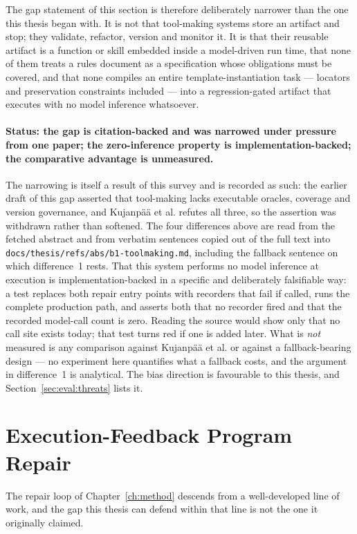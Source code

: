 The gap statement of this section is therefore deliberately narrower than the one this thesis
began with. It is not that tool-making systems store an artifact and stop; they validate,
refactor, version and monitor it. It is that their reusable artifact is a function or skill
embedded inside a model-driven run time, that none of them treats a rules document as a
specification whose obligations must be covered, and that none compiles an entire
template-instantiation task --- locators and preservation constraints included --- into a
regression-gated artifact that executes with no model inference whatsoever.

\paragraph{Status: the gap is citation-backed and was narrowed under pressure from one paper;
the zero-inference property is implementation-backed; the comparative advantage is unmeasured.}
The narrowing is itself a result of this survey and is recorded as such: the earlier draft of
this gap asserted that tool-making lacks executable oracles, coverage and version governance,
and Kujanpää et al. refutes all three, so the assertion was withdrawn rather than softened.
The four differences above are read from the fetched abstract and from verbatim sentences copied
out of the full text into \texttt{docs/thesis/refs/abs/b1-toolmaking.md}, including the fallback
sentence on which difference~1 rests. That this system performs no model inference at execution
is implementation-backed in a specific and deliberately falsifiable way: a test replaces both
repair entry points with recorders that fail if called, runs the complete production path, and
asserts both that no recorder fired and that the recorded model-call count is zero. Reading the
source would show only that no call site exists today; that test turns red if one is added
later. What is \emph{not} measured is any comparison against Kujanpää et al. or against a
fallback-bearing design --- no experiment here quantifies what a fallback costs, and the
argument in difference~1 is analytical. The bias direction is favourable to this thesis, and
Section~\ref{sec:eval:threats} lists it.

\section{Execution-Feedback Program Repair}
\label{sec:rel:repair}

The repair loop of Chapter~\ref{ch:method} descends from a well-developed line of work, and the
gap this thesis can defend within that line is not the one it originally claimed.

